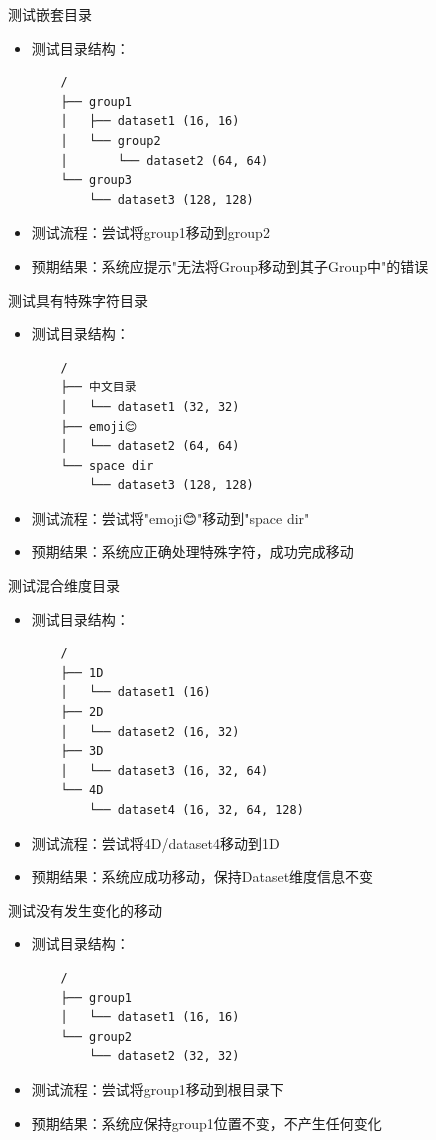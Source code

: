 \documentclass[a4paper,12pt]{report}	%
\begin{document}
测试嵌套目录
\begin{itemize}
    \item 测试目录结构：
    \begin{verbatim}
    /
    ├── group1
    │   ├── dataset1 (16, 16)
    │   └── group2
    │       └── dataset2 (64, 64)
    └── group3
        └── dataset3 (128, 128)
    \end{verbatim}
    \item 测试流程：尝试将group1移动到group2
    \item 预期结果：系统应提示"无法将Group移动到其子Group中"的错误
\end{itemize}

测试具有特殊字符目录
\begin{itemize}
    \item 测试目录结构：
    \begin{verbatim}
    /
    ├── 中文目录
    │   └── dataset1 (32, 32)
    ├── emoji😊
    │   └── dataset2 (64, 64)
    └── space dir
        └── dataset3 (128, 128)
    \end{verbatim}
    \item 测试流程：尝试将"emoji😊"移动到"space dir"
    \item 预期结果：系统应正确处理特殊字符，成功完成移动
\end{itemize}

测试混合维度目录
\begin{itemize}
    \item 测试目录结构：
    \begin{verbatim}
    /
    ├── 1D
    │   └── dataset1 (16)
    ├── 2D
    │   └── dataset2 (16, 32)
    ├── 3D
    │   └── dataset3 (16, 32, 64)
    └── 4D
        └── dataset4 (16, 32, 64, 128)
    \end{verbatim}
    \item 测试流程：尝试将4D/dataset4移动到1D
    \item 预期结果：系统应成功移动，保持Dataset维度信息不变
\end{itemize}

测试没有发生变化的移动
\begin{itemize}
    \item 测试目录结构：
    \begin{verbatim}
    /
    ├── group1
    │   └── dataset1 (16, 16)
    └── group2
        └── dataset2 (32, 32)
    \end{verbatim}
    \item 测试流程：尝试将group1移动到根目录下
    \item 预期结果：系统应保持group1位置不变，不产生任何变化
\end{itemize}
\end{document}

